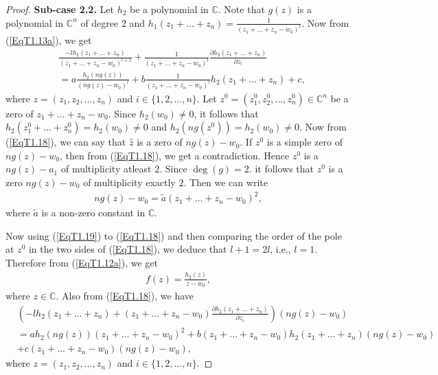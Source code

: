 \documentclass[10pt,a4paper]{amsart}
\begin{document}
\begin{proof}
\medskip
{\bf Sub-case 2.2.} Let $h_2$ be a polynomial in $\mathbb{C}$. Note that $g(z)$ is a polynomial in $\mathbb{C}^n$ of degree $2$ and $h_1(z_1+\ldots+z_n)=\frac{1}{(z_1+\ldots+z_n-w_0)^l}$. Now from (\ref{EqT1.13a}), we get
\begin{align}\label{EqT1.18}
&\frac{-lh_2(z_1+\ldots+z_n)}{(z_1+\ldots+z_n-w_0)^{l+1}}+\frac{1}{(z_1+\ldots+z_n-w_0)^l}\frac{\partial h_2(z_1+\ldots+z_n)}{\partial z_i}\\&=a\frac{h_2(ng(z))}{(ng(z)-w_0)^l}+b\frac{1}{(z_1+\ldots+z_n-w_0)^l}h_2(z_1+\ldots+z_n)+c,\nonumber
\end{align}
where $z=(z_1,z_2,\ldots,z_n)$ and $i\in\{1,2,\ldots,n\}$. Let $z^0=(z^0_1,z^0_2,\ldots,z^0_n)\in\mathbb{C}^n$ be a zero of $z_1+\ldots+z_n-w_0$. Since $h_2(w_0)\neq 0$, it follows that $h_2(z^0_1+\ldots+z^0_n)=h_2(w_0)\neq 0$ and $h_2(ng(z^0))=h_2(w_0)\neq 0$.
Now from (\ref{EqT1.18}), we can say that $\hat z$ is a zero of $ng(z)-w_0$. If $z^0$ is a simple zero of $ng(z)-w_0$, then from (\ref{EqT1.18}), we get a contradiction. Hence $z^0$ is a $ng(z)-a_1$ of multiplicity atleast $2$. Since $\deg(g)=2$. it follows that $z^0$ is a zero $ng(z)-w_0$ of multiplicity exactly $2$. Then we can write 
\begin{align}\label{EqT1.19}
ng(z)-w_0=\tilde a\left(z_1+\ldots+z_n-w_0\right)^2,
\end{align}
where $\tilde a$ is a non-zero constant in $\mathbb{C}$.

Now using (\ref{EqT1.19}) to (\ref{EqT1.18}) and then comparing the order of the pole at $z^0$ in the two sides of (\ref{EqT1.18}), we deduce that $l+1=2l$, i.e., $l=1$. Therefore from (\ref{EqT1.12a}), we get
\begin{align}\label{EqT1.19a}
f(z)=\frac{h_2(z)}{z-w_0},
\end{align}
where $z\in\mathbb{C}$. Also from (\ref{EqT1.18}), we have
\begin{align}\label{EqT1.20}
&\left(-lh_2(z_1+\ldots+z_n)+(z_1+\ldots+z_n-w_0)\frac{\partial h_2(z_1+\ldots+z_n)}{\partial z_i}\right)(ng(z)-w_0)\\&=ah_2(ng(z))(z_1+\ldots+z_n-w_0)^2+b(z_1+\ldots+z_n-w_0)h_2(z_1+\ldots+z_n)(ng(z)-w_0)\nonumber\\&+c(z_1+\ldots+z_n-w_0)(ng(z)-w_0),\nonumber
\end{align}
where $z=(z_1,z_2,\ldots,z_n)$ and $i\in\{1,2,\ldots,n\}$. 


\end{proof}
\end{document}
